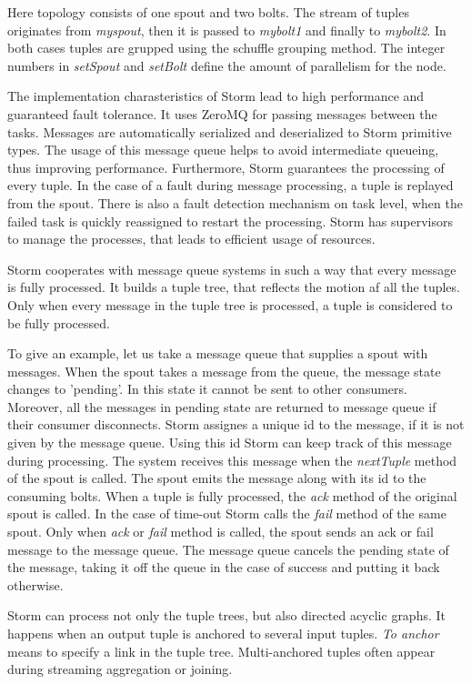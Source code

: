 Here topology consists of one spout and two bolts.
The stream of tuples originates from \textit{myspout}, then it is passed to \textit{mybolt1} and finally to \textit{mybolt2}.
In both cases tuples are grupped using the schuffle grouping method.
The integer numbers in \textit{setSpout} and \textit{setBolt} define the amount of parallelism for the node.

The implementation charasteristics of Storm lead to high performance and guaranteed fault tolerance.
It uses ZeroMQ for passing messages between the tasks.
Messages are automatically serialized and deserialized to Storm primitive types.
The usage of this message queue helps to avoid intermediate queueing, thus improving performance.
Furthermore, Storm guarantees the processing of every tuple.
In the case of a fault during message processing, a tuple is replayed from the spout.
There is also a fault detection mechanism on task level, when the failed task is quickly reassigned to restart the processing.
Storm has supervisors to manage the processes, that leads to efficient usage of resources.

Storm cooperates with message queue systems in such a way that every message is fully processed.
It builds a tuple tree, that reflects the motion af all the tuples.
Only when every message in the tuple tree is processed, a tuple is considered to be fully processed.

To give an example, let us take a message queue that supplies a spout with messages.
When the spout takes a message from the queue, the message state changes to 'pending'.
In this state it cannot be sent to other consumers.
Moreover, all the messages in pending state are returned to message queue if their consumer disconnects.
Storm assignes a unique id to the message, if it is not given by the message queue.
Using this id Storm can keep track of this message during processing.
The system receives this message when the \textit{nextTuple} method of the spout is called.
The spout emits the message along with its id to the consuming bolts.
When a tuple is fully processed, the \textit{ack} method of the original spout is called. 
In the case of time-out Storm calls the \textit{fail} method of the same spout.
Only when \textit{ack} or \textit{fail} method is called, the spout sends an ack or fail message to the message queue.
The message queue cancels the pending state of the message, taking it off the queue in the case of success and putting it back otherwise.

Storm can process not only the tuple trees, but also directed acyclic graphs.
It happens when an output tuple is anchored to several input tuples.
\textit{To anchor} means to specify a link in the tuple tree.
Multi-anchored tuples often appear during streaming aggregation or joining.
 
